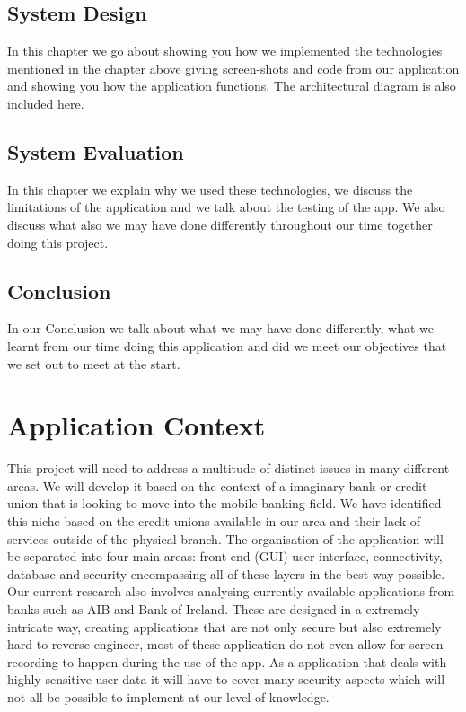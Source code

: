 \subsection{System Design}
In this chapter we go about showing you how we implemented the technologies mentioned in the chapter above giving screen-shots and code from our application and showing you how the application functions. The architectural diagram is also included here.

\subsection{System Evaluation}
In this chapter we explain why we used these technologies, we discuss the limitations of the application and we talk about the testing of the app. We also discuss what also we may have done differently throughout our time together doing this project.

\subsection{Conclusion}
In our Conclusion we talk about what we may have done differently, what we learnt from our time doing this application and did we meet our objectives that we set out to meet at the start.

\section{Application Context}
    This project will need to address a multitude of distinct issues in many different areas. We will develop it based on the context of a imaginary bank or credit union that is looking to move into the mobile banking field. We have identified this niche based on the credit unions available in our area and their lack of services outside of the physical branch.
    The organisation of the application will be separated into four main areas: front end (GUI) user interface, connectivity, database and security encompassing all of these layers in the best way possible.
    Our current research also involves analysing currently available applications from banks such as AIB and Bank of Ireland. These are designed in a extremely intricate way, creating applications that are not only secure but also extremely hard to reverse engineer, most of these application do not even allow for screen recording to happen during the use of the app.
    As a application that deals with highly sensitive user data it will have to cover many security aspects which will not all be possible to implement at our level of knowledge.


